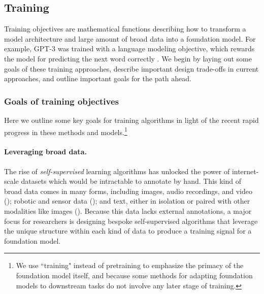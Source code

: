 \newsection
\subsection{Training}
\label{sec:training}

Training objectives are mathematical functions describing how to transform a model architecture and large amount of broad data into a foundation model. For example, GPT-3 was trained with a language modeling objective, which rewards the model for predicting the next word correctly \citep{Shannon1948AMT}. We begin by laying out some goals of these training approaches, describe important design trade-offs in current approaches, and outline important goals for the path ahead.

\subsubsection{Goals of training objectives} 

Here we outline some key goals for training algorithms in light of the recent rapid progress in these methods and models.\footnote{We use ``training" instead of pretraining to emphasize the primacy of the foundation model itself, and because some methods for adapting foundation models to downstream tasks do not involve any later stage of training.}

\paragraph{Leveraging broad data.} 
The rise of \textit{self-supervised} learning algorithms has unlocked the power of internet-scale datasets which would be intractable to annotate by hand. This kind of broad data comes in many forms, including images, audio recordings, and video (); robotic and sensor data (); and text, either in isolation or paired with other modalities like images (). Because this data lacks external annotations, a major focus for researchers is designing bespoke self-supervised algorithms that leverage the unique structure within each kind of data to produce a training signal for a foundation model.

